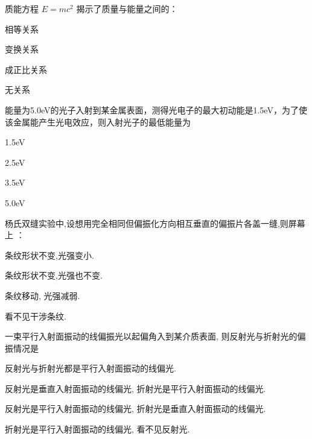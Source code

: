 \documentclass{njustexam}
\begin{document}
\begin{problem}

  质能方程 $E=mc^2$ 揭示了质量与能量之间的：
  \begin{abcd}
    \item 相等关系
    \item 变换关系
    \item 成正比关系
    \item 无关系
  \end{abcd}
  \end{problem}

  \begin{problem}
    能量为5.0eV的光子入射到某金属表面，测得光电子的最大初动能是1.5eV，为了使该金属能产生光电效应，则入射光子的最低能量为                                                 
        \begin{abcd}
          \item  1.5eV 
          \item  2.5eV  
          \item  3.5eV   
          \item  5.0eV
        \end{abcd}
        \end{problem}

\begin{problem}

    杨氏双缝实验中,设想用完全相同但偏振化方向相互垂直的偏振片各盖一缝,则屏幕上 ：
    \begin{abcd}
      \item 条纹形状不变,光强变小.
      \item 条纹形状不变,光强也不变.
      \item 条纹移动, 光强减弱.
      \item 看不见干涉条纹.
    \end{abcd}
\end{problem}


\begin{problem}
  一束平行入射面振动的线偏振光以起偏角入到某介质表面, 则反射光与折射光的偏振情况是 
  \begin{abcd}
    \item 反射光与折射光都是平行入射面振动的线偏光.
    \item 反射光是垂直入射面振动的线偏光, 折射光是平行入射面振动的线偏光.
    \item 反射光是平行入射面振动的线偏光, 折射光是垂直入射面振动的线偏光.
    \item 折射光是平行入射面振动的线偏光, 看不见反射光.
  \end{abcd}
\end{problem}
\end{document}

